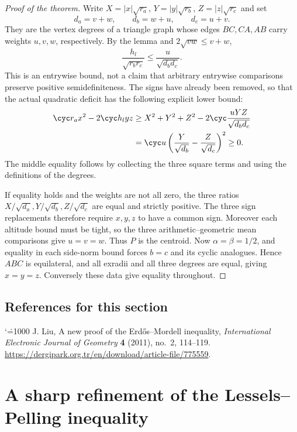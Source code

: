 \documentclass[11pt,a4paper]{article}
\makeatletter
\numberwithin{equation}{section}
\theoremstyle{definition}
\theoremstyle{remark}
\renewenvironment{thebibliography}[1]
 {\subsection*{References for this section}\small
  \list{\@biblabel{\@arabic\c@enumiv}}
       {\settowidth\labelwidth{\@biblabel{#1}}\leftmargin\labelwidth
        \advance\leftmargin\labelsep\@openbib@code
        \usecounter{enumiv}\let\p@enumiv\@empty
        \renewcommand\theenumiv{\@arabic\c@enumiv}}
  \sloppy\clubpenalty4000\widowpenalty4000\sfcode`\.=1000\relax}
 {\def\@noitemerr{\@latex@warning{Empty bibliography}}\endlist}
\makeatother
\begin{document}
\begin{proof}[Proof of the theorem]
Write $X=|x|\sqrt{r_a}$, $Y=|y|\sqrt{r_b}$, $Z=|z|\sqrt{r_c}$ and set
\[
           d_a=v+w,\qquad d_b=w+u,\qquad d_c=u+v.
\]
They are the vertex degrees of a triangle graph whose edges $BC,CA,AB$ carry weights $u,v,w$, respectively. By the lemma and $2\sqrt{vw}\le v+w$,
\[
 \frac{h_l}{\sqrt{r_br_c}}\le\frac{u}{\sqrt{d_bd_c}}.
\]
This is an entrywise bound, not a claim that arbitrary entrywise comparisons preserve positive semidefiniteness. The signs have already been removed, so that the actual quadratic deficit has the following explicit lower bound:
\begin{align*}
 \cyc r_a x^2-2\cyc h_l yz
 &\ge X^2+Y^2+Z^2-2\cyc\frac{uYZ}{\sqrt{d_bd_c}}\\
 &=\cyc u\left(\frac{Y}{\sqrt{d_b}}-\frac{Z}{\sqrt{d_c}}\right)^2\ge0.
\end{align*}
The middle equality follows by collecting the three square terms and using the definitions of the degrees.

If equality holds and the weights are not all zero, the three ratios $X/\sqrt{d_a},Y/\sqrt{d_b},Z/\sqrt{d_c}$ are equal and strictly positive. The three sign replacements therefore require $x,y,z$ to have a common sign. Moreover each altitude bound must be tight, so the three arithmetic--geometric mean comparisons give $u=v=w$. Thus $P$ is the centroid. Now $\alpha=\beta=1/2$, and equality in each side-norm bound forces $b=c$ and its cyclic analogues. Hence $ABC$ is equilateral, and all exradii and all three degrees are equal, giving $x=y=z$. Conversely these data give equality throughout.
\end{proof}
\begin{thebibliography}{1}
 J. Liu, A new proof of the Erd\H os--Mordell inequality, \emph{International Electronic Journal of Geometry} \textbf{4} (2011), no.~2, 114--119. \url{https://dergipark.org.tr/en/download/article-file/775559}.
\end{thebibliography}

\par\endgroup

\begingroup

\section{\texorpdfstring{A sharp refinement of the Lessels--Pelling inequality}{A sharp refinement of the Lessels--Pelling inequality}}\label{section:r40meiji}
\par\medskip
\end{document}
